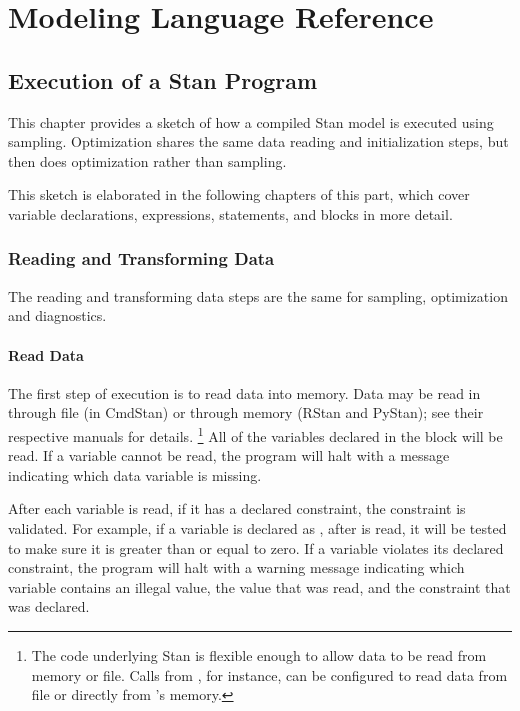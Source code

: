 \part{Modeling Language Reference}

\chapter{Execution of a Stan Program}

\noindent 
This chapter provides a sketch of how a compiled Stan model is
executed using sampling.  Optimization shares the same data reading
and initialization steps, but then does optimization rather than sampling.

This sketch is elaborated in the following chapters of this part,
which cover variable declarations, expressions, statements, and blocks
in more detail.


\section{Reading and Transforming Data}

The reading and transforming data steps are the same for sampling,
optimization and diagnostics.

\subsection{Read Data}

The first step of execution is to read data into memory.   Data may be
read in through file (in CmdStan) or through memory (RStan and
PyStan);  see their respective manuals for details.
%
\footnote{The \Cpp code underlying Stan is flexible enough to allow
  data to be read from memory or file.  Calls from \R, for instance,
  can be configured to read data from file or directly from \R's
  memory.}
%
All of the variables declared in the  block will be read.
If a variable cannot be read, the program will halt with a message
indicating which data variable is missing.

After each variable is read, if it has a declared constraint, the
constraint is validated.  For example, if a variable  is
declared as , after  is read, it will be tested
to make sure it is greater than or equal to zero.  If a variable
violates its declared constraint, the program will halt with a warning
message indicating which variable contains an illegal value, the value
that was read, and the constraint that was declared.

